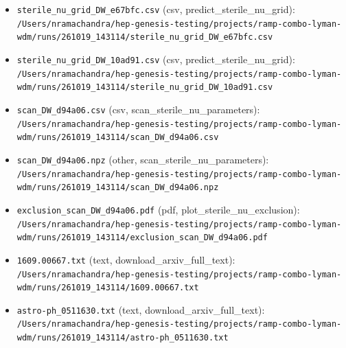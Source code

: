 \documentclass[11pt,a4paper]{article}
\begin{document}
\begin{itemize}
  \item \texttt{sterile\_\allowbreak{}nu\_\allowbreak{}grid\_\allowbreak{}DW\_\allowbreak{}e67bfc.csv} (csv, predict\_sterile\_nu\_grid): \texttt{/\allowbreak{}Users/\allowbreak{}nramachandra/\allowbreak{}hep-genesis-testing/\allowbreak{}projects/\allowbreak{}ramp-combo-lyman-wdm/\allowbreak{}runs/\allowbreak{}261019\_\allowbreak{}143114/\allowbreak{}sterile\_\allowbreak{}nu\_\allowbreak{}grid\_\allowbreak{}DW\_\allowbreak{}e67bfc.csv}
  \item \texttt{sterile\_\allowbreak{}nu\_\allowbreak{}grid\_\allowbreak{}DW\_\allowbreak{}10ad91.csv} (csv, predict\_sterile\_nu\_grid): \texttt{/\allowbreak{}Users/\allowbreak{}nramachandra/\allowbreak{}hep-genesis-testing/\allowbreak{}projects/\allowbreak{}ramp-combo-lyman-wdm/\allowbreak{}runs/\allowbreak{}261019\_\allowbreak{}143114/\allowbreak{}sterile\_\allowbreak{}nu\_\allowbreak{}grid\_\allowbreak{}DW\_\allowbreak{}10ad91.csv}
  \item \texttt{scan\_\allowbreak{}DW\_\allowbreak{}d94a06.csv} (csv, scan\_sterile\_nu\_parameters): \texttt{/\allowbreak{}Users/\allowbreak{}nramachandra/\allowbreak{}hep-genesis-testing/\allowbreak{}projects/\allowbreak{}ramp-combo-lyman-wdm/\allowbreak{}runs/\allowbreak{}261019\_\allowbreak{}143114/\allowbreak{}scan\_\allowbreak{}DW\_\allowbreak{}d94a06.csv}
  \item \texttt{scan\_\allowbreak{}DW\_\allowbreak{}d94a06.npz} (other, scan\_sterile\_nu\_parameters): \texttt{/\allowbreak{}Users/\allowbreak{}nramachandra/\allowbreak{}hep-genesis-testing/\allowbreak{}projects/\allowbreak{}ramp-combo-lyman-wdm/\allowbreak{}runs/\allowbreak{}261019\_\allowbreak{}143114/\allowbreak{}scan\_\allowbreak{}DW\_\allowbreak{}d94a06.npz}
  \item \texttt{exclusion\_\allowbreak{}scan\_\allowbreak{}DW\_\allowbreak{}d94a06.pdf} (pdf, plot\_sterile\_nu\_exclusion): \texttt{/\allowbreak{}Users/\allowbreak{}nramachandra/\allowbreak{}hep-genesis-testing/\allowbreak{}projects/\allowbreak{}ramp-combo-lyman-wdm/\allowbreak{}runs/\allowbreak{}261019\_\allowbreak{}143114/\allowbreak{}exclusion\_\allowbreak{}scan\_\allowbreak{}DW\_\allowbreak{}d94a06.pdf}
  \item \texttt{1609.00667.txt} (text, download\_arxiv\_full\_text): \texttt{/\allowbreak{}Users/\allowbreak{}nramachandra/\allowbreak{}hep-genesis-testing/\allowbreak{}projects/\allowbreak{}ramp-combo-lyman-wdm/\allowbreak{}runs/\allowbreak{}261019\_\allowbreak{}143114/\allowbreak{}1609.00667.txt}
  \item \texttt{astro-ph\_\allowbreak{}0511630.txt} (text, download\_arxiv\_full\_text): \texttt{/\allowbreak{}Users/\allowbreak{}nramachandra/\allowbreak{}hep-genesis-testing/\allowbreak{}projects/\allowbreak{}ramp-combo-lyman-wdm/\allowbreak{}runs/\allowbreak{}261019\_\allowbreak{}143114/\allowbreak{}astro-ph\_\allowbreak{}0511630.txt}
\end{itemize}
\end{document}
